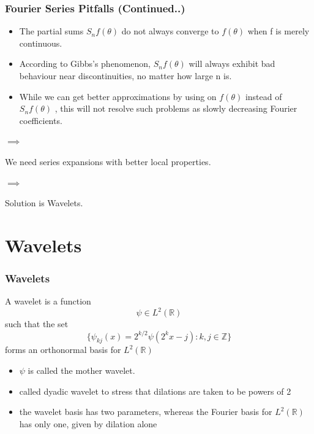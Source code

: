 \documentclass{beamer}
\begin{document}
\begin{frame}
    \frametitle{Fourier Series Pitfalls (Continued..)}
    
    \begin{itemize}
        \item The partial sums $S_n f (\theta )$ do not always converge to $f (\theta )$ when f is merely continuous.
        \item According to Gibbs’s phenomenon, $S_n f (\theta )$ will always exhibit bad behaviour near discontinuities, no matter how large n is.
        \item While we can get better approximations by using on $f (\theta )$ instead of $S_n f (\theta )$ , this will not resolve such problems as
        slowly decreasing Fourier coefficients.
    \end{itemize}
    $\implies$

    \begin{center}
        We need series expansions with better local properties.     
    \end{center}
    
    $\implies$

    \begin{center}
        Solution is Wavelets.
    \end{center}
    

    \end{frame}

    

\section{Wavelets} %

\begin{frame}
\frametitle{Wavelets}
\begin{definition}[15.1.1]
    A wavelet is a function $$\psi \in L^2 \left({\mathbb{R}}\right)$$ such that the set
    $$\{\psi_{kj}(x) = 2^{k/2}\psi(2^kx-j): k,j \in \mathbb{Z} \}$$
    forms an orthonormal basis for $L^2\left({\mathbb{R}}\right)$
\end{definition}

\begin{itemize}
\item $\psi$ is called the mother wavelet.
\item called dyadic wavelet to stress that dilations are taken to be powers of 2
\item the wavelet basis has two parameters, whereas the Fourier basis for $L^2\left({\mathbb{R}}\right)$  has only one, given by dilation alone
\end{itemize}

\end{frame}
\end{document}
